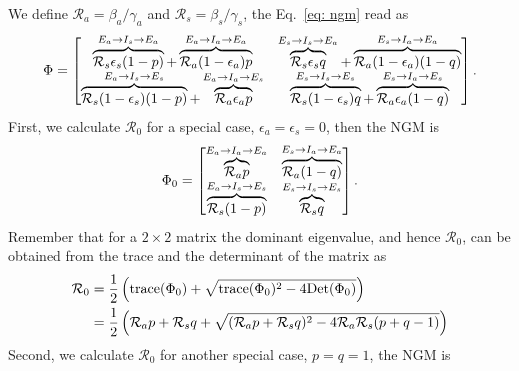 \documentclass[a4paper,12pt]{article}
\begin{document}
We define $\mathcal{R}_{a} = \beta_{a}/\gamma_{a}$ and $\mathcal{R}_{s} = \beta_{s}/\gamma_{s}$,  the Eq.~\ref{eq: ngm} read as
\begin{align}\label{eq: ngm - 1}
\begin{split}
\Phi = \begin{bmatrix} 
\overbrace{\mathcal{R}_{s}\epsilon_{s}(1 - p)}^{E_{a} \rightarrow I_{s} \rightarrow E_{a}} + \overbrace{\mathcal{R}_{a}(1 - \epsilon_{a})p}^{E_{a} \rightarrow I_{a} \rightarrow E_{a}}&
\overbrace{\mathcal{R}_{s}\epsilon_{s}q}^{E_{s} \rightarrow I_{s} \rightarrow E_{a}} + \overbrace{\mathcal{R}_{a}(1 - \epsilon_{a})(1 - q)}^{E_{s} \rightarrow I_{a} \rightarrow E_{a}}\\
\overbrace{\mathcal{R}_{s}(1 - \epsilon_{s})(1 - p)}^{E_{a} \rightarrow I_{s} \rightarrow E_{s}} + \overbrace{\mathcal{R}_{a}\epsilon_{a}p}^{E_{a} \rightarrow I_{a} \rightarrow E_{s}}&
\overbrace{\mathcal{R}_{s} (1 -\epsilon_{s})q}^{E_{s} \rightarrow I_{s} \rightarrow E_{s}} +\overbrace{\mathcal{R}_{a}\epsilon_{a}(1 - q)}^{E_{s} \rightarrow I_{a} \rightarrow E_{s}}
\end{bmatrix}.
\end{split}
\end{align}
First, we calculate $\mathcal{R}_{0}$ for a special case, $\epsilon_{a} = \epsilon_{s} = 0$, then the NGM is 
\begin{align}\label{eq: ngm - special}
\begin{split}
\Phi_{0} = \begin{bmatrix} 
\overbrace{\mathcal{R}_{a} p}^{E_{a} \rightarrow I_{a} \rightarrow E_{a}}&
\overbrace{\mathcal{R}_{a} (1 - q)}^{E_{s} \rightarrow I_{a} \rightarrow E_{a}}\\
\overbrace{\mathcal{R}_{s}(1 - p)}^{E_{a} \rightarrow I_{s} \rightarrow E_{s}} &
\overbrace{\mathcal{R}_{s} q}^{E_{s} \rightarrow I_{s} \rightarrow E_{s}} 
\end{bmatrix}.
\end{split}
\end{align}
Remember that for a $2\times2$ matrix the dominant eigenvalue, and hence $\mathcal{R}_{0}$, can be obtained from the trace and the determinant of the matrix as
\begin{align}\label{eq: R0 - special}
\begin{split}
\mathcal{R}_{0} &= \frac{1}{2}\left(\text{trace}(\Phi_{0}) + \sqrt{\text{trace}(\Phi_{0})^{2} - 4 \text{Det}(\Phi_{0})}\right)\\
&= \frac{1}{2}\left(\mathcal{R}_{a} p + \mathcal{R}_{s} q + \sqrt{(\mathcal{R}_{a} p + \mathcal{R}_{s} q)^{2} - 4\mathcal{R}_{a}\mathcal{R}_{s} (p + q - 1)}\right)
\end{split}
\end{align}
Second, we calculate $\mathcal{R}_{0}$ for another special case, $p = q = 1$, the NGM is
\end{document}
